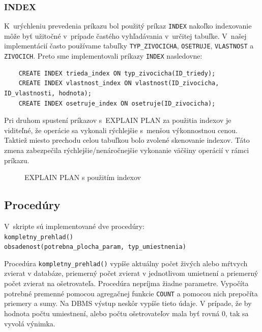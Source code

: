\documentclass[a4paper, 11pt]{article}
\begin{document}
        \subsubsection{INDEX}
         K~urýchleniu prevedenia príkazu bol použitý príkaz \texttt{INDEX} nakoľko indexovanie môže byť užitočné v~prípade častého vyhľadávania v~určitej tabuľke. V~našej implementácií často používame tabuľky \texttt{TYP\_ZIVOCICHA}, \texttt{OSETRUJE}, \texttt{VLASTNOST} a \texttt{ZIVOCICH}.
          Preto sme implementovali príkazy \texttt{INDEX} nasledovne:
    \begin{lstlisting}
    CREATE INDEX trieda_index ON typ_zivocicha(ID_triedy);
    CREATE INDEX vlastnost_index ON vlastnost(ID_zivocicha, ID_vlastnosti, hodnota);
    CREATE INDEX osetruje_index ON osetruje(ID_zivocicha);
    \end{lstlisting}
        Pri druhom spustení príkazov s~EXPLAIN PLAN za použitia indexov je viditeľné, že operácie sa vykonali rýchlejšie s~menšou výkonnostnou cenou. Taktiež miesto prechodu celou tabuľkou bolo zvolené skenovanie indexov. Táto zmena zabezpečila rýchlejšie/nenáročnejšie vykonanie väčšiny operácií v rámci príkazu.
	
	\begin{figure}[h]
		\centering
		\caption{EXPLAIN PLAN s použitím indexov}
	\end{figure}

	\subsection{Procedúry} 
	V~skripte sú implementované dve procedúry:\\
	\texttt{kompletny\_prehlad()}\\
	\texttt{obsadenost(potrebna\_plocha\_param, typ\_umiestnenia)}
	
	Procedúra \texttt{kompletny\_prehlad()} vypíše aktuálny počet živých alebo mŕtvych zvierat v databáze, priemerný počet zvierat v jednotlivom umietnení a priemerný počet zvierat na ošetrovateľa. Procedúra nepríjma žiadne parametre. Vypočíta potrebné premenné pomocou agregačnej funkcie \texttt{COUNT} a pomocou nich prepočíta priemery a sumy. Na DBMS výstup neskôr vypíše tieto údaje. V prípade, že by hodnota počtu umiestnení, alebo počtu ošetrovateľov mala byť rovná 0, tak sa vyvolá výnimka.
	
\end{document}
